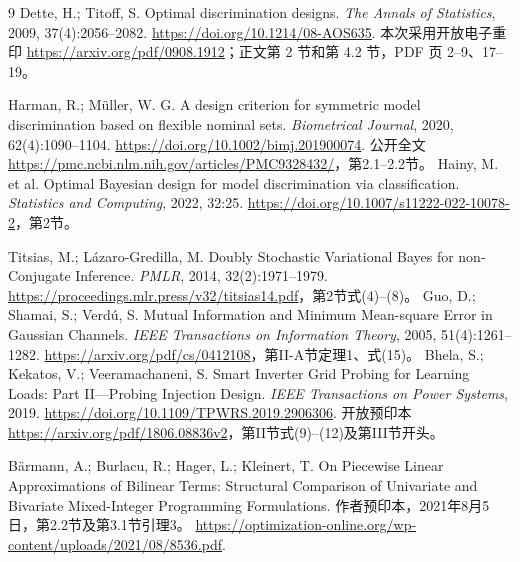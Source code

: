 \documentclass[UTF8,fontset=fandol,11pt,a4paper]{ctexart}
\begin{document}
\begin{thebibliography}{9}
Dette, H.; Titoff, S.
Optimal discrimination designs.
\emph{The Annals of Statistics}, 2009, 37(4):2056--2082.
\url{https://doi.org/10.1214/08-AOS635}.
本次采用开放电子重印 \url{https://arxiv.org/pdf/0908.1912}；正文第 2 节和第 4.2 节，PDF 页 2--9、17--19。

Harman, R.; M\"uller, W. G.
A design criterion for symmetric model discrimination based on flexible nominal sets.
\emph{Biometrical Journal}, 2020, 62(4):1090--1104.
\url{https://doi.org/10.1002/bimj.201900074}.
公开全文\url{https://pmc.ncbi.nlm.nih.gov/articles/PMC9328432/}，第2.1--2.2节。
Hainy, M. et al.
Optimal Bayesian design for model discrimination via classification.
\emph{Statistics and Computing}, 2022, 32:25.
\url{https://doi.org/10.1007/s11222-022-10078-2}，第2节。

Titsias, M.; L\'azaro-Gredilla, M.
Doubly Stochastic Variational Bayes for non-Conjugate Inference.
\emph{PMLR}, 2014, 32(2):1971--1979.
\url{https://proceedings.mlr.press/v32/titsias14.pdf}，第2节式(4)--(8)。
Guo, D.; Shamai, S.; Verd\'u, S.
Mutual Information and Minimum Mean-square Error in Gaussian Channels.
\emph{IEEE Transactions on Information Theory}, 2005, 51(4):1261--1282.
\url{https://arxiv.org/pdf/cs/0412108}，第II-A节定理1、式(15)。
Bhela, S.; Kekatos, V.; Veeramachaneni, S.
Smart Inverter Grid Probing for Learning Loads: Part II---Probing Injection Design.
\emph{IEEE Transactions on Power Systems}, 2019.
\url{https://doi.org/10.1109/TPWRS.2019.2906306}.
开放预印本\url{https://arxiv.org/pdf/1806.08836v2}，第II节式(9)--(12)及第III节开头。

B\"armann, A.; Burlacu, R.; Hager, L.; Kleinert, T.
On Piecewise Linear Approximations of Bilinear Terms: Structural Comparison of Univariate and Bivariate Mixed-Integer Programming Formulations.
作者预印本，2021年8月5日，第2.2节及第3.1节引理3。
\url{https://optimization-online.org/wp-content/uploads/2021/08/8536.pdf}.
\end{thebibliography}
\end{document}
